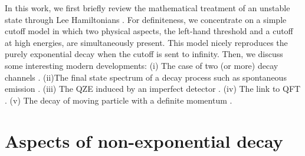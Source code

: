 \documentclass[12pt]{article}%
\begin{document}
In this work, we first briefly review the mathematical treatment of an
unstable state through Lee Hamiltonians \cite{lee}. For definiteness, we
concentrate on a simple cutoff model in which two physical aspects, the
left-hand threshold and a cutoff at high energies, are simultaneously present.
This model nicely reproduces the purely exponential decay when the cutoff is
sent to infinity. Then, we discuss some interesting modern developments: (i)
The case of two (or more) decay channels \cite{duecan}. (ii)The final state
spectrum of a decay process such as spontaneous emission \cite{giacosapra}.
(iii) The QZE induced by an imperfect detector \cite{gplast}. (iv) The link to
QFT \cite{zenoqft}. (v) The decay of moving particle with a definite momentum
\cite{time}.

\section{Aspects of non-exponential decay}
\end{document}

